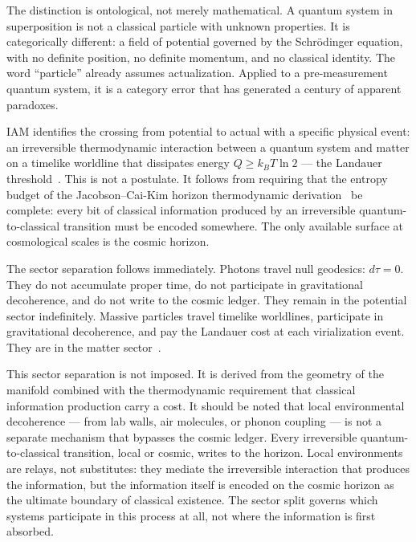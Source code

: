 \documentclass[12pt,a4paper]{article}
\begin{document}
The distinction is ontological, not merely mathematical. A quantum system
in superposition is not a classical particle with unknown properties. It
is categorically different: a field of potential governed by the
Schr\"{o}dinger equation, with no definite position, no definite
momentum, and no classical identity. The word ``particle'' already
assumes actualization. Applied to a pre-measurement quantum system, it
is a category error that has generated a century of apparent paradoxes.

IAM identifies the crossing from potential to actual with a specific
physical event: an irreversible thermodynamic interaction between a
quantum system and matter on a timelike worldline that dissipates
energy $Q \geq k_B T \ln 2$ --- the Landauer threshold~\citep{Landauer1961}.
This is not a postulate. It follows from requiring that the entropy
budget of the Jacobson--Cai-Kim horizon thermodynamic
derivation~\citep{Jacobson1995,CaiKim2005} be complete: every bit of
classical information produced by an irreversible quantum-to-classical
transition must be encoded somewhere. The only available surface at
cosmological scales is the cosmic horizon.

The sector separation follows immediately. Photons travel null geodesics:
$d\tau = 0$. They do not accumulate proper time, do not participate in
gravitational decoherence, and do not write to the cosmic ledger. They
remain in the potential sector indefinitely. Massive particles travel
timelike worldlines, participate in gravitational decoherence, and pay
the Landauer cost at each virialization event. They are in the matter
sector~\citep{IAM_time}.

This sector separation is not imposed. It is derived from the geometry
of the manifold combined with the thermodynamic requirement that
classical information production carry a cost. It should be noted that
local environmental decoherence --- from lab walls, air molecules, or
phonon coupling --- is not a separate mechanism that bypasses the cosmic
ledger. Every irreversible quantum-to-classical transition, local or
cosmic, writes to the horizon. Local environments are relays, not
substitutes: they mediate the irreversible interaction that produces the
information, but the information itself is encoded on the cosmic horizon
as the ultimate boundary of classical existence. The sector split governs
which systems participate in this process at all, not where the
information is first absorbed.

\end{document}
